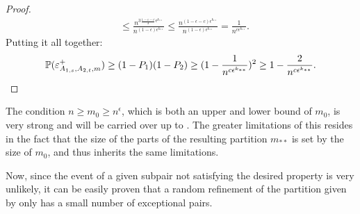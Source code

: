 \begin{lemma}
\begin{proof}
\[\begin{split}
                            & \leq \frac{n^{3\frac{1-\epsilon-c}{3} \epsilon^{k_{**}}}}{n^{(1-\epsilon)\epsilon^{k_{**}}}}
                                \leq \frac{n^{(1-\epsilon-c) \epsilon^{k_{**}}}}{n^{(1-\epsilon)\epsilon^{k_{**}}}}
                                = \frac{1}{n^{c \epsilon^{k_{**}}}}.
                    \end{split}
                \]
                Putting it all together:
                \[
                    \mathbb{P}(\varepsilon^+_{A_{1,s},A_{2,t},m})
                        \geq (1 - P_1) (1 - P_2)
                        \geq ( 1 - \frac{1}{n^{c \epsilon^{k_{**}}}} )^2
                        \geq 1 - \frac{2}{n^{c\epsilon^{k_{**}}}}.
                \]
            \end{proof}
        \end{lemma}

        \begin{remark}
            The condition $n \geq m_0 \geq n^\epsilon$, which is both an upper and lower bound of $m_0$, is very strong and will be carried over
            up to .
            The greater limitations of this resides in the fact that the size of the parts of the resulting partition $m_{**}$
            is set by the size of $m_0$, and thus inherits the same limitations.
        \end{remark}

        Now, since the event of a given subpair not satisfying the desired property is very unlikely, it can be easily proven
        that a random refinement of the partition given by  only has
        a small number of exceptional pairs.

